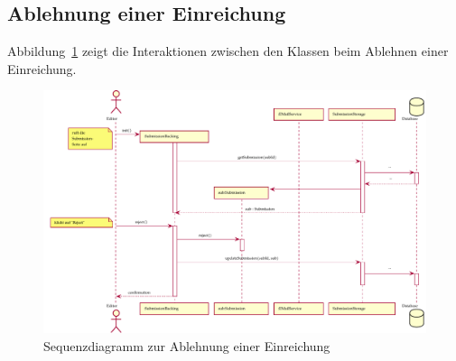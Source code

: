 
\subsection{Ablehnung einer Einreichung}\label{subsec:sequenz-ablehnung}

Abbildung~\ref{fig:upload-review-sequence} zeigt die Interaktionen zwischen den Klassen beim Ablehnen einer Einreichung.

\begin{figure}
    \centering
    \includegraphics[width=\textwidth]{graphics/reject_submission}
    \caption{Sequenzdiagramm zur Ablehnung einer Einreichung}
    \label{fig:upload-review-sequence}
\end{figure}
